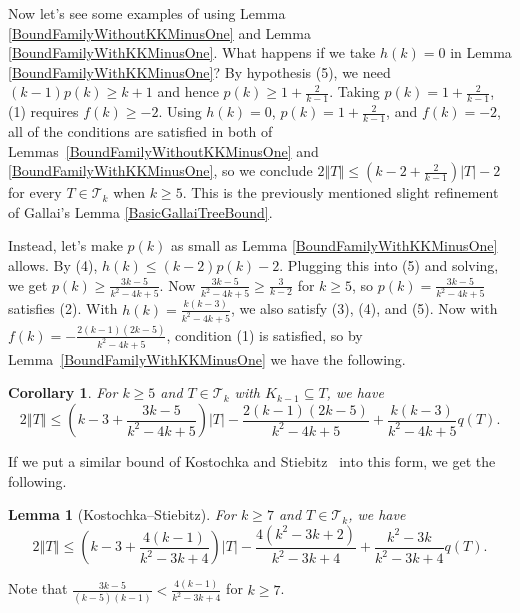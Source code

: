 \documentclass[12pt]{article}
\theoremstyle{plain}
\newtheorem{lem}[thm]{Lemma}
\newtheorem{cor}[thm]{Corollary}
\theoremstyle{definition}
\theoremstyle{remark}
\newcommand{\fancy}[1]{\mathcal{#1}}
\newcommand{\T}{\fancy{T}}
\newcommand{\card}[1]{\left|#1\right|}
\newcommand{\size}[1]{\left\Vert#1\right\Vert}
\newcommand{\parens}[1]{\left( #1 \right)}
\begin{document}
Now let's see some examples of using Lemma \ref{BoundFamilyWithoutKKMinusOne}
and Lemma \ref{BoundFamilyWithKKMinusOne}.  What happens if we take $h(k) = 0$
in Lemma \ref{BoundFamilyWithKKMinusOne}?  By hypothesis (5), we need
$(k-1)p(k) \ge k + 1$ and hence $p(k) \ge 1 + \frac{2}{k-1}$.  Taking $p(k) = 1 +
\frac{2}{k-1}$, (1) requires $f(k) \ge -2$.  Using $h(k)=0$,
$p(k)=1+\frac2{k-1}$, and $f(k) = -2$, all of the conditions are satisfied in
both of Lemmas~\ref{BoundFamilyWithoutKKMinusOne} and
\ref{BoundFamilyWithKKMinusOne}, so we conclude $2\size{T} \le \parens{k-2 +
\frac{2}{k-1}}\card{T} - 2$ for every $T \in \T_k$ when $k \ge 5$.  This is the
previously mentioned slight refinement of Gallai's Lemma \ref{BasicGallaiTreeBound}.

Instead, let's make $p(k)$ as small as Lemma \ref{BoundFamilyWithKKMinusOne}
allows. By (4), $h(k) \le (k-2)p(k) - 2$. Plugging this into (5) and solving,
we get $p(k) \ge \frac{3k-5}{k^2 - 4k + 5}$.  Now $\frac{3k-5}{k^2 - 4k + 5}
\ge \frac{3}{k-2}$ for $k \ge 5$, so $p(k) = \frac{3k-5}{k^2 - 4k + 5}$
satisfies (2).  With $h(k) = \frac{k(k-3)}{k^2 - 4k + 5}$, we also satisfy (3),
(4), and (5).  Now with $f(k) = -\frac{2(k-1)(2k-5)}{k^2 - 4k + 5}$, condition
(1) is satisfied, so by Lemma~\ref{BoundFamilyWithKKMinusOne} we have the following.

\begin{cor}\label{SmallP}
	For $k \ge 5$ and $T \in \T_k$ with $K_{k-1} \subseteq T$, we have
	\[2\size{T} \le \parens{k-3 + \frac{3k-5}{k^2 - 4k + 5}}\card{T} - \frac{2(k-1)(2k-5)}{k^2 - 4k + 5} + 
	\frac{k(k-3)}{k^2 - 4k + 5}q(T).\]
\end{cor}

If we put a similar bound of Kostochka and
Stiebitz~\cite{kostochkastiebitzedgesincriticalgraph} into this form, we get
the following.
\begin{lem}[Kostochka--Stiebitz]




		For $k \ge 7$ and $T \in \T_k$, we have
		\[2\size{T} \le \parens{k-3 + \frac{4(k-1)}{k^2 - 3k + 4}}\card{T} - \frac{4(k^2-3k+2)}{k^2-3k+4} + 
		\frac{k^2 - 3k}{k^2-3k+4}q(T).\]
\end{lem}
\noindent
Note that $\frac{3k-5}{(k-5)(k-1)} < \frac{4(k-1)}{k^2 - 3k + 4}$ for $k \ge 7$.
\end{document}
